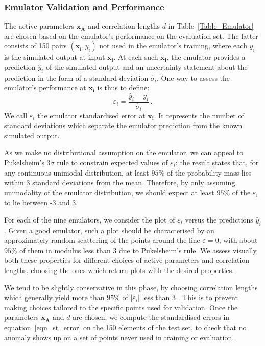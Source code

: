 \documentclass[preprint,12pt, sort&compress]{elsarticle}
\newcommand{\bd}[1]{\boldsymbol{#1}}
\newcommand{\x}[1][]{\bd{x_{#1}}}
\begin{document}

\subsubsection{Emulator Validation and Performance}\label{Subsec_Validation}

The active parameters $\x[A]$ and correlation lengths $d$ in Table~\ref{Table_Emulator} are chosen based on the emulator’s performance on the evaluation set. The latter consists of 150 pairs $(\x[i], y_i)$ not used in the emulator’s training, where each $y_i$ is the simulated output at input $\x[i]$. At each such $\x[i]$, the emulator provides a prediction $\hat y_i$ of the simulated output and an uncertainty statement about the prediction in the form of a standard deviation $\hat\sigma_i$. One way to assess the emulator’s performance at $\x[i]$ is thus to define: 
\begin{equation}\label{eqn_st_error}
\varepsilon_i = \frac{\hat y_i - y_i}{\hat \sigma_i}\,.
\end{equation}
We call $\varepsilon_i$ the emulator standardised error at $\x[i]$. It represents the number of standard deviations which separate the emulator prediction from the known simulated output.

As we make no distributional assumption on the emulator, we can appeal to Pukelsheim’s $3\sigma$ rule \cite{3sigma} to constrain expected values of $\varepsilon_i$: the result states that, for any continuous unimodal distribution, at least $95\%$ of the probability mass lies within 3 standard deviations from the mean. Therefore, by only assuming unimodality of the emulator distribution, we should expect at least $95\%$ of the $\varepsilon_i$ to lie between -3 and 3. 

For each of the nine emulators, we consider the plot of $\varepsilon_i$ versus the predictions $\hat y_i$. Given a good emulator, such a plot should be characterised by an approximately random scattering of the points around the line $\varepsilon=0$, with about $95\%$ of them in modulus less than 3 due to Pukelsheim’s rule. We assess visually both these properties for different choices of active parameters and correlation lengths, choosing the ones which return plots with the desired properties. 

We tend to be slightly conservative in this phase, by choosing correlation lengths which generally yield more than $95\%$ of $|\varepsilon_i|$ less than 3 . This is to prevent making choices tailored to the specific points used for validation. Once the parameters $\x[A]$ and $d$ are chosen, we compute the standardised errors in equation~\eqref{eqn_st_error} on the 150 elements of the test set, to check that no anomaly shows up on a set of points never used in training or evaluation.
\end{document}
